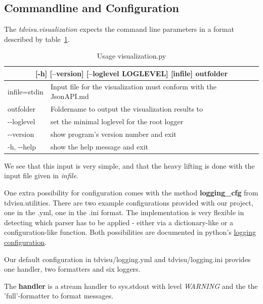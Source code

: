 \documentclass[a4paper, 12pt, bibliography=totoc]{scrartcl}
\begin{document}

\subsection{Commandline and Configuration}


The \textit{tdvisu.visualization} expects the command line parameters in a format described by table~\ref{tab:optionstdvisu}.

\def\arraystretch{1.2}%
\begin{longtable}{|ll|}
	\caption{Usage visualization.py 
		\label{tab:optionstdvisu}}\\
	\hline 
	\multicolumn{2}{|c|}{[-h] [--version] [--loglevel LOGLEVEL] [infile] outfolder}
	\\[2ex]
	\endfirsthead

	infile=stdin &  Input file for the visualization must conform with the JsonAPI.md\\
	outfolder &  Foldername to output the visualization results to\\
	-{}-loglevel  &   set the minimal loglevel for the root logger\\
	-{}-version & show program's version number and exit\\
	-h, -{}-help & show the help message and exit\\
	\hline
\end{longtable}

We see that this input is very simple, and that the heavy lifting is done with the input file given in \textit{infile}.

One extra possibility for configuration comes with the method \textbf{logging\_cfg} from {tdvisu.utilities}. There are two example configurations provided with our project, one in the .yml, one in the .ini format. The implementation is very flexible in detecting which parser has to be applied - either via a dictionary-like or a configuration-like function. Both possibilities are documented in python's \href{https://docs.python.org/3/library/logging.config.html#logging-config-api}{logging configuration}.

Our default configuration in tdvisu/logging.yml and tdvisu/logging.ini provides one handler, two formatters and six loggers.

The \textbf{handler} is a stream handler to sys.stdout with level \textit{WARNING} and the the 'full'-formatter to format messages.
\end{document}
